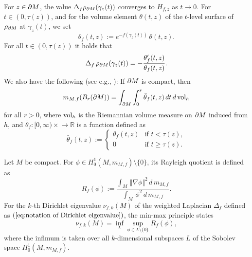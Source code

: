For $z\in \partial M$,
the value $\Delta_{f}\rho_{\partial M}(\gamma_{z}(t))$ converges to $H_{f,z}$ as $t\to 0$.
For $t \in (0,\tau(z))$,
and for the volume element $\theta(t,z)$ of the $t$-level surface of $\rho_{\partial M}$ at $\gamma_{z}(t)$,
we set
\begin{equation}\label{eq:volume element}
\theta_{f}(t,z):=e^{-f(\gamma_{z}(t))}\, \theta(t,z).
\end{equation}
For all $t\in (0,\tau(z))$
it holds that
\begin{equation}\label{eq:Laplacian representation}
\Delta_{f}\, \rho_{\partial M}(\gamma_{z}(t)) =-\frac{\theta_{f}'(t,z)}{\theta_{f}(t,z)}.
\end{equation}
We also have the following (see e.g., \cite{S1}):
If $\partial M$ is compact,
then
\begin{equation}\label{eq:integration formula}
m_{M,f}( B_{r}(\partial M))=\int_{\partial M} \int^{r}_{0}\bar{\theta}_{f}(t,z)\,dt\,d\operatorname{vol}_{h}
\end{equation}
for all $r>0$,
where $\operatorname{vol}_{h}$ is the Riemannian volume measure on $\partial M$ induced from $h$,
and $\bar{\theta}_{f}:[0,\infty) \times \bm \to \mathbb{R}$ is a function defined as
\begin{equation}\label{eq:extended volume element}
  \bar{\theta}_{f}(t,z) := \begin{cases}
                                     \theta_{f}(t,z) & \text{if $t< \tau(z)$}, \\
                                             0           & \text{if $t \geq \tau(z)$}.
                                    \end{cases}
\end{equation}

Let $M$ be compact.
For $\phi \in H^{1}_{0}(M,m_{M,f})\setminus \{0\}$,
its Rayleigh quotient is defined as
\begin{equation}\label{eq:Rayleigh quotient}
R_{f}(\phi):=\frac{\int_{M}\, \Vert \nabla \phi \Vert^{2}\,d\,m_{M,f}}{\int_{M}\, \phi^{2}\,d\,m_{M,f}}.
\end{equation}
For the $k$-th Dirichlet eigenvalue $\nu_{f,k}(M)$ of the weighted Laplacian $\Delta_{f}$ defined as $(\ref{eq:notation of Dirichlet eigenvalue})$,
the min-max principle states
\begin{equation}\label{eq:min-max principle}
\nu_{f,k}(M)=\inf_{L} \sup_{\phi \in L\setminus \{0\}} R_{f}(\phi),
\end{equation}
where the infimum is taken over all $k$-dimensional subspaces $L$ of the Sobolev space $H^{1}_{0}(M,m_{M,f})$.

